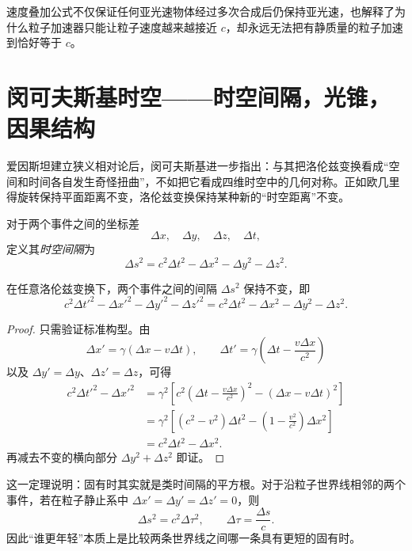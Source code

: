 \begin{remark}
速度叠加公式不仅保证任何亚光速物体经过多次合成后仍保持亚光速，也解释了为什么粒子加速器只能让粒子速度越来越接近 $c$，却永远无法把有静质量的粒子加速到恰好等于 $c$。
\end{remark}

\section{闵可夫斯基时空——时空间隔，光锥，因果结构}

爱因斯坦建立狭义相对论后，闵可夫斯基进一步指出：与其把洛伦兹变换看成“空间和时间各自发生奇怪扭曲”，不如把它看成四维时空中的几何对称。正如欧几里得旋转保持平面距离不变，洛伦兹变换保持某种新的“时空距离”不变。

\begin{definition}
对于两个事件之间的坐标差
\[
\Delta x,\quad \Delta y,\quad \Delta z,\quad \Delta t,
\]
定义其\emph{时空间隔}为
\[
\Delta s^2=c^2\Delta t^2-\Delta x^2-\Delta y^2-\Delta z^2.
\]
\end{definition}

\begin{theorem}[时空间隔不变]
在任意洛伦兹变换下，两个事件之间的间隔 $\Delta s^2$ 保持不变，即
\[
 c^2\Delta t'^2-\Delta x'^2-\Delta y'^2-\Delta z'^2
 =
 c^2\Delta t^2-\Delta x^2-\Delta y^2-\Delta z^2.
\]
\end{theorem}

\begin{proof}
只需验证标准构型。由
\[
\Delta x'=\gamma(\Delta x-v\Delta t),
\qquad
\Delta t'=\gamma\left(\Delta t-\frac{v\Delta x}{c^2}\right)
\]
以及 $\Delta y'=\Delta y$、$\Delta z'=\Delta z$，可得
\begin{align*}
 c^2\Delta t'^2-\Delta x'^2
 &=\gamma^2\left[c^2\left(\Delta t-\frac{v\Delta x}{c^2}\right)^2-(\Delta x-v\Delta t)^2\right] \\
 &=\gamma^2\left[(c^2-v^2)\Delta t^2-\left(1-\frac{v^2}{c^2}\right)\Delta x^2\right] \\
 &=c^2\Delta t^2-\Delta x^2.
\end{align*}
再减去不变的横向部分 $\Delta y^2+\Delta z^2$ 即证。
\end{proof}

这一定理说明：固有时其实就是类时间隔的平方根。对于沿粒子世界线相邻的两个事件，若在粒子静止系中 $\Delta x'=\Delta y'=\Delta z'=0$，则
\[
\Delta s^2=c^2\Delta \tau^2,
\qquad
\Delta \tau=\frac{\Delta s}{c}.
\]
因此“谁更年轻”本质上是比较两条世界线之间哪一条具有更短的固有时。

